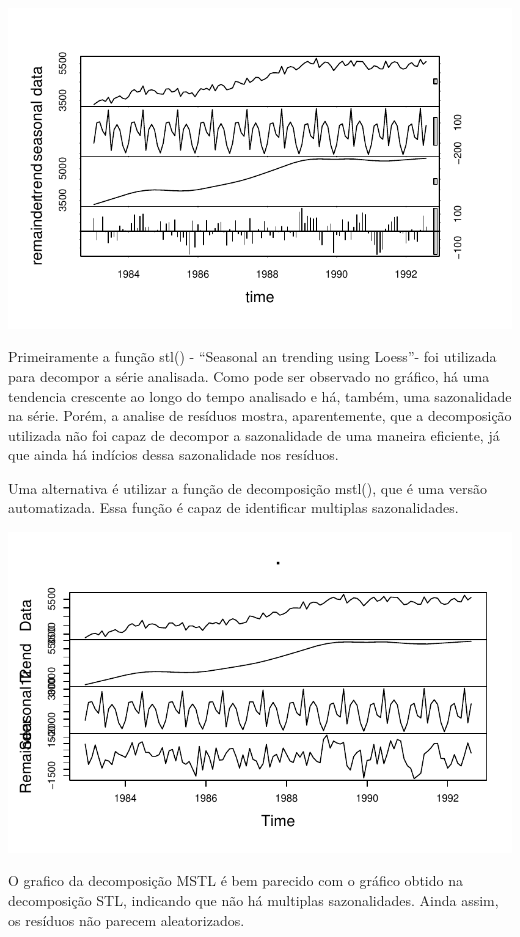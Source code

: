 \documentclass[
  letterpaper,
  DIV=11,
  numbers=noendperiod]{scrartcl}
\begin{document}
\includegraphics{Trabalhao1_ST_grupo5_files/figure-pdf/unnamed-chunk-3-1.pdf}

Primeiramente a função stl() - ``Seasonal an trending using Loess''- foi
utilizada para decompor a série analisada. Como pode ser observado no
gráfico, há uma tendencia crescente ao longo do tempo analisado e há,
também, uma sazonalidade na série. Porém, a analise de resíduos mostra,
aparentemente, que a decomposição utilizada não foi capaz de decompor a
sazonalidade de uma maneira eficiente, já que ainda há indícios dessa
sazonalidade nos resíduos.

Uma alternativa é utilizar a função de decomposição mstl(), que é uma
versão automatizada. Essa função é capaz de identificar multiplas
sazonalidades.

\includegraphics{Trabalhao1_ST_grupo5_files/figure-pdf/unnamed-chunk-4-1.pdf}

O grafico da decomposição MSTL é bem parecido com o gráfico obtido na
decomposição STL, indicando que não há multiplas sazonalidades. Ainda
assim, os resíduos não parecem aleatorizados.
\end{document}
